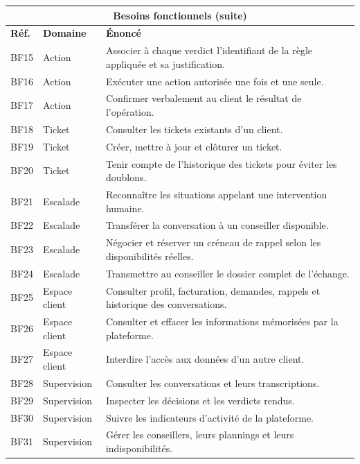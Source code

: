 \newpage

\begin{table}[H]
\centering
\renewcommand{\arraystretch}{1.2}
\begin{tabular}{|p{1.3cm}|p{3.4cm}|p{9.2cm}|}
\hline
\multicolumn{3}{|c|}{\textbf{Besoins fonctionnels (suite)}} \\
\hline
\textbf{Réf.} & \textbf{Domaine} & \textbf{Énoncé} \\
\hline
BF15 & Action & Associer à chaque verdict l'identifiant de la règle appliquée et sa justification. \\
\hline
BF16 & Action & Exécuter une action autorisée une fois et une seule. \\
\hline
BF17 & Action & Confirmer verbalement au client le résultat de l'opération. \\
\hline
BF18 & Ticket & Consulter les tickets existants d'un client. \\
\hline
BF19 & Ticket & Créer, mettre à jour et clôturer un ticket. \\
\hline
BF20 & Ticket & Tenir compte de l'historique des tickets pour éviter les doublons. \\
\hline
BF21 & Escalade & Reconnaître les situations appelant une intervention humaine. \\
\hline
BF22 & Escalade & Transférer la conversation à un conseiller disponible. \\
\hline
BF23 & Escalade & Négocier et réserver un créneau de rappel selon les disponibilités réelles. \\
\hline
BF24 & Escalade & Transmettre au conseiller le dossier complet de l'échange. \\
\hline
BF25 & Espace client & Consulter profil, facturation, demandes, rappels et historique des conversations. \\
\hline
BF26 & Espace client & Consulter et effacer les informations mémorisées par la plateforme. \\
\hline
BF27 & Espace client & Interdire l'accès aux données d'un autre client. \\
\hline
BF28 & Supervision & Consulter les conversations et leurs transcriptions. \\
\hline
BF29 & Supervision & Inspecter les décisions et les verdicts rendus. \\
\hline
BF30 & Supervision & Suivre les indicateurs d'activité de la plateforme. \\
\hline
BF31 & Supervision & Gérer les conseillers, leurs plannings et leurs indisponibilités. \\

\end{tabular}
\end{table}
